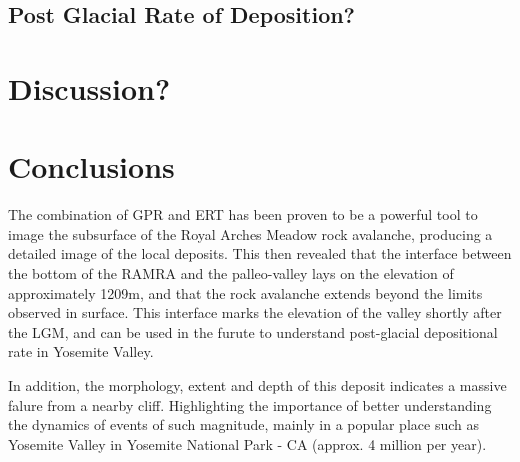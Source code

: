 \documentclass[5p]{elsarticle}
\begin{document}
    
    \subsection{Post Glacial Rate of Deposition?}
    
		
										
\section{Discussion?}

										
\section{Conclusions}

The combination of GPR and ERT has been proven to be a powerful tool to image the subsurface of the Royal Arches Meadow rock avalanche, producing a detailed image of the local deposits. This then revealed that the interface between the bottom of the RAMRA and the palleo-valley lays on the elevation of approximately 1209m, and that the rock avalanche extends beyond the limits observed in surface. This interface marks the elevation of the valley shortly after the LGM, and can be used in the furute to understand post-glacial depositional rate in Yosemite Valley.  

In addition, the morphology, extent and depth of this deposit indicates a massive falure from a nearby cliff. Highlighting the importance of better understanding the dynamics of events of such magnitude, mainly in a popular place such as Yosemite Valley in Yosemite National Park - CA (approx. 4 million per year).



\end{document}
